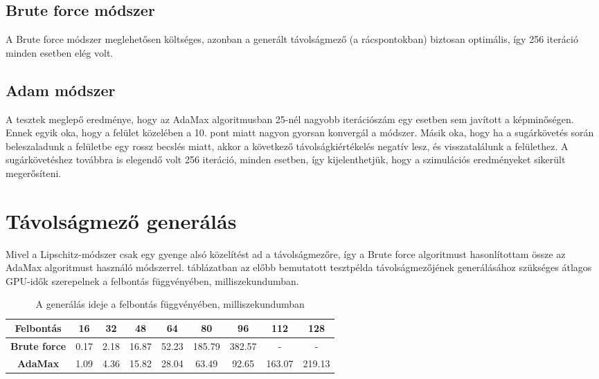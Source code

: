 \subsection{Brute force módszer}
A Brute force módszer meglehetősen költséges, azonban a generált távolságmező (a rácspontokban) biztosan optimális, így 256 iteráció minden esetben elég volt.

\subsection{Adam módszer}
A tesztek meglepő eredménye, hogy az AdaMax algoritmusban 25-nél nagyobb iterációszám egy esetben sem javított a képminőségen. Ennek egyik oka, hogy a felület közelében a 10. pont miatt nagyon gyorsan konvergál a módszer. Másik oka, hogy ha a sugárkövetés során beleszaladunk a felületbe egy rossz becslés miatt, akkor a következő távolságkiértékelés negatív lesz, és visszatalálunk a felülethez. A sugárkövetéshez továbbra is elegendő volt 256 iteráció, minden esetben, így kijelenthetjük, hogy a szimulációs eredményeket sikerült megerősíteni.


\section{Távolságmező generálás}
Mivel a Lipschitz-módszer csak egy gyenge alsó közelítést ad a távolságmezőre, így a Brute force algoritmust hasonlítottam össze az AdaMax algoritmust használó  módszerrel.  táblázatban az előbb bemutatott tesztpélda távolságmezőjének generálásához szükséges átlagos GPU-idők szerepelnek a felbontás függvényében, milliszekundumban.

\begin{table}[H]
	\begin{center}
		\begin{tabular}{| c || c | c | c | c | c | c | c | c |}
			\hline
			\textbf{Felbontás} & 16	& 32 & 48 & 64 & 80 & 96 & 112 & 128 \\ 
			\hline\hline
			\textbf{Brute force} & 0.17 & 2.18 & 16.87 & 52.23 & 185.79 & 382.57 & - & - \\
			\hline
			\textbf{AdaMax} & 1.09 & 4.36 & 15.82 & 28.04 & 63.49 & 92.65 & 163.07 & 219.13
			\\
			\hline
		\end{tabular}
	\end{center}
	\caption{A generálás ideje a felbontás függvényében, milliszekundumban}
	\label{tab:gen}
\end{table}


